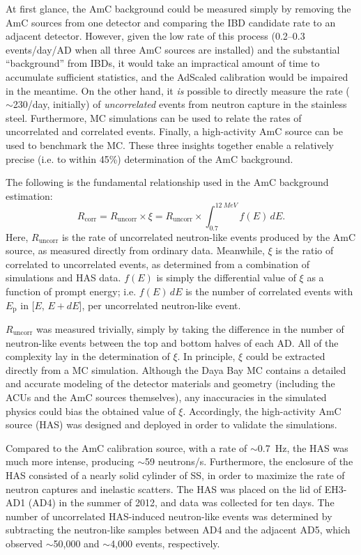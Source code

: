 \documentclass[../thesis.tex]{subfiles}
\begin{document}
At first glance, the AmC background could be measured simply by removing the AmC
sources from one detector and comparing the IBD candidate rate to an adjacent
detector. However, given the low rate of this process (0.2--0.3 events/day/AD
when all three AmC sources are installed) and the substantial ``background''
from IBDs, it would take an impractical amount of time to accumulate sufficient
statistics, and the AdScaled calibration would be impaired in the meantime. On
the other hand, it \emph{is} possible to directly measure the rate
($\sim$230/day, initially) of \emph{uncorrelated} events from neutron capture in
the stainless steel. Furthermore, MC simulations can be used to relate the rates
of uncorrelated and correlated events. Finally, a high-activity AmC source can
be used to benchmark the MC. These three insights together enable a relatively
precise (i.e. to within 45\%) determination of the AmC background.

The following is the fundamental relationship used in the AmC background
estimation:
\begin{equation*}
  R_{\mathrm{corr}} = R_{\mathrm{uncorr}} \times \xi = R_{\mathrm{uncorr}} \times \int_{0.7}^{\SI{12}{MeV}} f(E)\,dE.
\end{equation*}
Here, $R_{\mathrm{uncorr}}$ is the rate of uncorrelated neutron-like events
produced by the AmC source, as measured directly from ordinary data. Meanwhile,
$\xi$ is the ratio of correlated to uncorrelated events, as determined from a
combination of simulations and HAS data. $f(E)$ is simply the differential value
of $\xi$ as a function of prompt energy; i.e. $f(E)\,dE$ is the number of
correlated events with $E_{\mathrm{p}}$ in [$E$, $E + dE$], per uncorrelated
neutron-like event.

$R_{\mathrm{uncorr}}$ was measured trivially, simply by taking the difference in
the number of neutron-like events between the top and bottom halves of each
AD. All of the complexity lay in the determination of $\xi$. In principle, $\xi$
could be extracted directly from a MC simulation. Although the Daya Bay MC
contains a detailed and accurate modeling of the detector materials and geometry
(including the ACUs and the AmC sources themselves), any inaccuracies in the
simulated physics could bias the obtained value of $\xi$. Accordingly, the
high-activity AmC source (HAS) was designed and deployed in order to validate
the simulations.

Compared to the AmC calibration source, with a rate of $\sim$0.7~Hz, the HAS was
much more intense, producing $\sim$59 neutrons/s. Furthermore, the enclosure of
the HAS consisted of a nearly solid cylinder of SS, in order to maximize the
rate of neutron captures and inelastic scatters. The HAS was placed on the lid
of EH3-AD1 (AD4) in the summer of 2012, and data was collected for ten days. The
number of uncorrelated HAS-induced neutron-like events was determined by
subtracting the neutron-like samples between AD4 and the adjacent AD5, which
observed $\sim$50,000 and $\sim$4,000 events, respectively.
\end{document}

